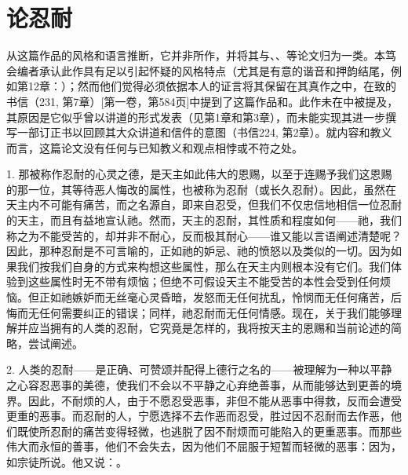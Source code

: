 
\chapter{论忍耐}


从这篇作品的风格和语言推断，它并非所作，并将其与、、等论文归为一类。本笃会编者承认此作具有足以引起怀疑的风格特点（尤其是有意的谐音和押韵结尾，例如第12章：）；然而他们觉得必须依据本人的证言将其保留在其真作之中，在致的书信（231, 第7章）[第一卷，第584页]中提到了这篇作品和。此作未在中被提及，其原因是它似乎曾以讲道的形式发表（见第1章和第3章），而未能实现其进一步撰写一部订正书以回顾其大众讲道和信件的意图（书信224, 第2章）。就内容和教义而言，这篇论文没有任何与已知教义和观点相悖或不符之处。\par

1. 那被称作忍耐的心灵之德，是天主如此伟大的恩赐，以至于连赐予我们这恩赐的那一位，其等待恶人悔改的属性，也被称为忍耐（或长久忍耐）。因此，虽然在天主内不可能有痛苦，而之名源自，即来自忍受，但我们不仅忠信地相信一位忍耐的天主，而且有益地宣认祂。然而，天主的忍耐，其性质和程度如何——祂，我们称之为不能受苦的，却并非不耐心，反而极其耐心——谁又能以言语阐述清楚呢？因此，那种忍耐是不可言喻的，正如祂的妒忌、祂的愤怒以及类似的一切。因为如果我们按我们自身的方式来构想这些属性，那么在天主内则根本没有它们。我们体验到这些属性时无不带有烦恼；但绝不可假设天主不能受苦的本性会受到任何烦恼。但正如祂嫉妒而无丝毫心灵昏暗，发怒而无任何扰乱，怜悯而无任何痛苦，后悔而无任何需要纠正的错误；同样，祂忍耐而无任何情感。现在，关于我们能够理解并应当拥有的人类的忍耐，它究竟是怎样的，我将按天主的恩赐和当前论述的简略，尝试阐述。\par

2. 人类的忍耐——是正确、可赞颂并配得上德行之名的——被理解为一种以平静之心容忍恶事的美德，使我们不会以不平静之心弃绝善事，从而能够达到更善的境界。因此，不耐烦的人，由于不愿忍受恶事，非但不能从恶事中得救，反而会遭受更重的恶事。而忍耐的人，宁愿选择不去作恶而忍受，胜过因不忍耐而去作恶，他们既使所忍耐的痛苦变得轻微，也逃脱了因不耐烦而可能陷入的更重恶事。而那些伟大而永恒的善事，他们不会失去，因为他们不屈服于短暂而轻微的恶事：因为，如宗徒所说。他又说：。\par

